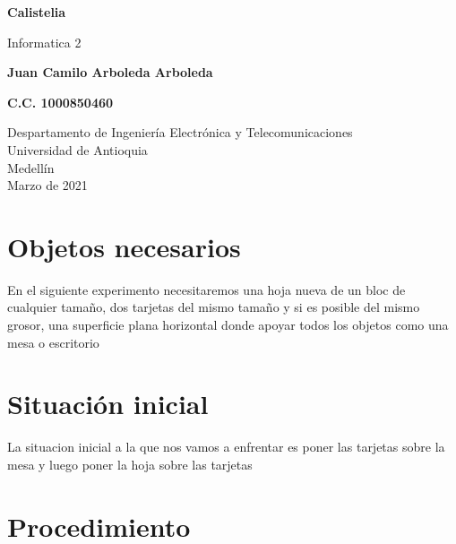 \documentclass{article}
\begin{document}
\begin{titlepage}
    \begin{center}
        \vspace*{1cm}
            
        \Huge
        \textbf{Calistelia}
            
        \vspace{0.5cm}
        \LARGE
        Informatica 2
            
        \vspace{1.5cm}
            
        \textbf{Juan Camilo Arboleda Arboleda}
        
        \vspace{0.5cm}
            
        \textbf{C.C. 1000850460}
            
        \vfill
            
        \vspace{0.8cm}
            
        \Large
        Despartamento de Ingeniería Electrónica y Telecomunicaciones\\
        Universidad de Antioquia\\
        Medellín\\
        Marzo de 2021
            
    \end{center}
\end{titlepage}

\tableofcontents
\newpage
\section{Objetos necesarios}\label{intro}
En el siguiente experimento necesitaremos una hoja nueva de un bloc de cualquier tamaño, dos tarjetas del mismo tamaño y si es posible del mismo grosor, una superficie plana horizontal donde apoyar todos los objetos como una mesa o escritorio

\section{Situación inicial}\label{intro}
La situacion inicial a la que nos vamos a enfrentar es poner las tarjetas sobre la mesa y luego poner la hoja sobre las tarjetas 


\section{Procedimiento} \label{contenido}
\end{document}
